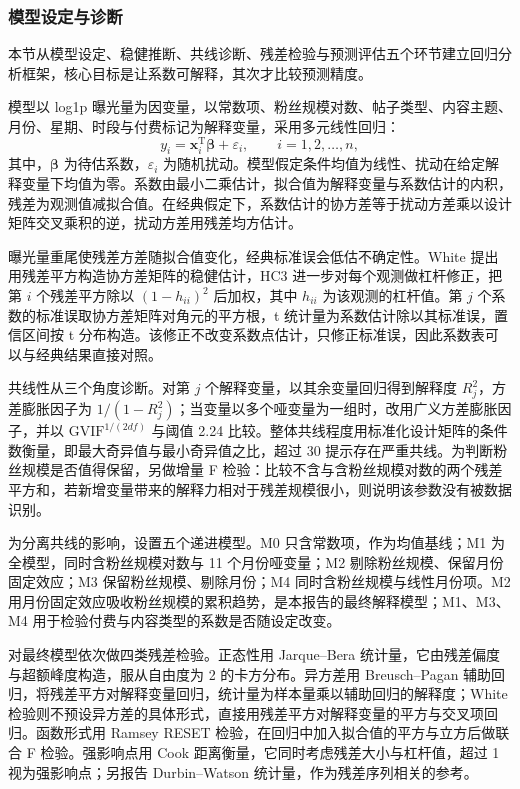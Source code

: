 \subsubsection{模型设定与诊断}

本节从模型设定、稳健推断、共线诊断、残差检验与预测评估五个环节建立回归分析框架，核心目标是让系数可解释，其次才比较预测精度。

模型以 log1p 曝光量为因变量，以常数项、粉丝规模对数、帖子类型、内容主题、月份、星期、时段与付费标记为解释变量，采用多元线性回归：
\begin{equation}
    y_i=\boldsymbol{x}_i^{\mathrm{T}}\boldsymbol{\beta}+\varepsilon_i,
    \qquad i=1,2,\ldots,n,
\end{equation}
其中，$\boldsymbol{\beta}$ 为待估系数，$\varepsilon_i$ 为随机扰动。模型假定条件均值为线性、扰动在给定解释变量下均值为零。系数由最小二乘估计，拟合值为解释变量与系数估计的内积，残差为观测值减拟合值。在经典假定下，系数估计的协方差等于扰动方差乘以设计矩阵交叉乘积的逆，扰动方差用残差均方估计。

曝光量重尾使残差方差随拟合值变化，经典标准误会低估不确定性。White 提出用残差平方构造协方差矩阵的稳健估计\cite{white1980}，HC3 进一步对每个观测做杠杆修正，把第 $i$ 个残差平方除以 $(1-h_{ii})^2$ 后加权，其中 $h_{ii}$ 为该观测的杠杆值。第 $j$ 个系数的标准误取协方差矩阵对角元的平方根，t 统计量为系数估计除以其标准误，置信区间按 t 分布构造。该修正不改变系数点估计，只修正标准误，因此系数表可以与经典结果直接对照。

共线性从三个角度诊断。对第 $j$ 个解释变量，以其余变量回归得到解释度 $R_j^2$，方差膨胀因子为 $1/(1-R_j^2)$；当变量以多个哑变量为一组时，改用广义方差膨胀因子，并以 $\mathrm{GVIF}^{1/(2df)}$ 与阈值 2.24 比较\cite{fox2016}。整体共线程度用标准化设计矩阵的条件数衡量，即最大奇异值与最小奇异值之比，超过 30 提示存在严重共线。为判断粉丝规模是否值得保留，另做增量 F 检验：比较不含与含粉丝规模对数的两个残差平方和，若新增变量带来的解释力相对于残差规模很小，则说明该参数没有被数据识别。

为分离共线的影响，设置五个递进模型。M0 只含常数项，作为均值基线；M1 为全模型，同时含粉丝规模对数与 11 个月份哑变量；M2 剔除粉丝规模、保留月份固定效应；M3 保留粉丝规模、剔除月份；M4 同时含粉丝规模与线性月份项。M2 用月份固定效应吸收粉丝规模的累积趋势，是本报告的最终解释模型；M1、M3、M4 用于检验付费与内容类型的系数是否随设定改变。

对最终模型依次做四类残差检验。正态性用 Jarque--Bera 统计量，它由残差偏度与超额峰度构造，服从自由度为 2 的卡方分布\cite{jarque1980}。异方差用 Breusch--Pagan 辅助回归，将残差平方对解释变量回归，统计量为样本量乘以辅助回归的解释度\cite{breusch1979}；White 检验则不预设异方差的具体形式，直接用残差平方对解释变量的平方与交叉项回归。函数形式用 Ramsey RESET 检验，在回归中加入拟合值的平方与立方后做联合 F 检验\cite{ramsey1969}。强影响点用 Cook 距离衡量，它同时考虑残差大小与杠杆值，超过 1 视为强影响点；另报告 Durbin--Watson 统计量，作为残差序列相关的参考。

